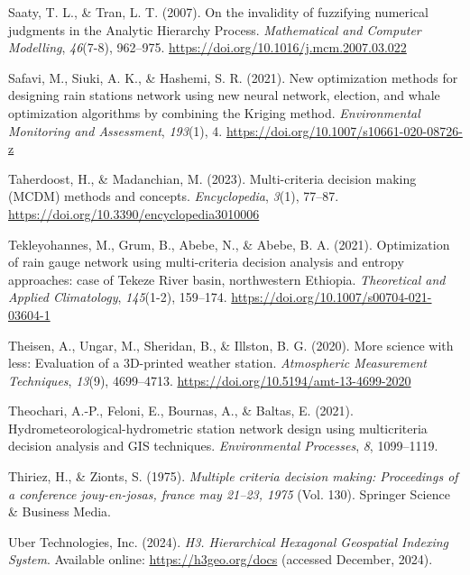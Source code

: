 \documentclass[spanish]{article}
\newlength{\cslhangindent}
\newlength{\cslentryspacingunit} %
\newenvironment{CSLReferences}[2] %
 {%
  \setlength{\parindent}{0pt}
  \ifodd #1
  \let\oldpar\par
  \def\par{\hangindent=\cslhangindent\oldpar}
  \fi
  \setlength{\parskip}{#2\cslentryspacingunit}
 }%
 {}
\begin{document}
\begin{CSLReferences}{1}{0}
\leavevmode{}%
Saaty, T. L., \& Tran, L. T. (2007). On the invalidity of fuzzifying
numerical judgments in the Analytic Hierarchy Process.
\emph{Mathematical and Computer Modelling}, \emph{46}(7-8), 962--975.
\url{https://doi.org/10.1016/j.mcm.2007.03.022}

\leavevmode{}%
Safavi, M., Siuki, A. K., \& Hashemi, S. R. (2021). New optimization
methods for designing rain stations network using new neural network,
election, and whale optimization algorithms by combining the Kriging
method. \emph{Environmental Monitoring and Assessment}, \emph{193}(1),
4. \url{https://doi.org/10.1007/s10661-020-08726-z}

\leavevmode{}%
Taherdoost, H., \& Madanchian, M. (2023). Multi-criteria decision making
(MCDM) methods and concepts. \emph{Encyclopedia}, \emph{3}(1), 77--87.
\url{https://doi.org/10.3390/encyclopedia3010006}

\leavevmode{}%
Tekleyohannes, M., Grum, B., Abebe, N., \& Abebe, B. A. (2021).
Optimization of rain gauge network using multi-criteria decision
analysis and entropy approaches: case of Tekeze River basin,
northwestern Ethiopia. \emph{Theoretical and Applied Climatology},
\emph{145}(1-2), 159--174.
\url{https://doi.org/10.1007/s00704-021-03604-1}

\leavevmode{}%
Theisen, A., Ungar, M., Sheridan, B., \& Illston, B. G. (2020). More
science with less: Evaluation of a 3D-printed weather station.
\emph{Atmospheric Measurement Techniques}, \emph{13}(9), 4699--4713.
\url{https://doi.org/10.5194/amt-13-4699-2020}

\leavevmode{}%
Theochari, A.-P., Feloni, E., Bournas, A., \& Baltas, E. (2021).
Hydrometeorological-hydrometric station network design using
multicriteria decision analysis and GIS techniques. \emph{Environmental
Processes}, \emph{8}, 1099--1119.

\leavevmode{}%
Thiriez, H., \& Zionts, S. (1975). \emph{Multiple criteria decision
making: Proceedings of a conference jouy-en-josas, france may 21--23,
1975} (Vol. 130). Springer Science \& Business Media.

\leavevmode{}%
Uber Technologies, Inc. (2024). \emph{{H3. Hierarchical Hexagonal
Geospatial Indexing System}}. Available online:
\url{https://h3geo.org/docs} (accessed December, 2024).


\end{CSLReferences}
\end{document}
